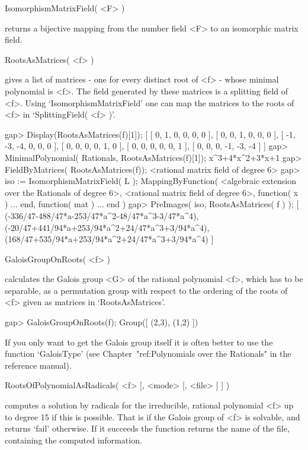 \> IsomorphismMatrixField( <F> )

returns a bijective mapping from the number field <F> to an isomorphic
matrix field.
 
\> RootsAsMatrices( <f> )

gives a list of matrices - one for every distinct root of <f> - whose minimal
polynomial is <f>. The field generated by these matrices is a
splitting field of <f>. Using `IsomorphismMatrixField' one can map the
matrices to the roots of <f> in `SplittingField( <f> )'.

\beginexample
gap> Display(RootsAsMatrices(f)[1]);
[ [   0,   1,   0,   0,   0,   0 ],
  [   0,   0,   1,   0,   0,   0 ],
  [  -1,  -3,  -4,   0,   0,   0 ],
  [   0,   0,   0,   0,   1,   0 ],
  [   0,   0,   0,   0,   0,   1 ],
  [   0,   0,   0,  -1,  -3,  -4 ] ]
gap> MinimalPolynomial( Rationals, RootsAsMatrices(f)[1]);
x^3+4*x^2+3*x+1
gap> FieldByMatrices( RootsAsMatrices(f));
<rational matrix field of degree 6>
gap> iso := IsomorphismMatrixField( L );
MappingByFunction( <algebraic extension over the Rationals of degree
6>, <rational matrix field of degree
6>, function( x ) ... end, function( mat ) ... end )
gap> PreImages( iso, RootsAsMatrices( f ) );
[ (-336/47-488/47*a-253/47*a^2-48/47*a^3-3/47*a^4),
  (-20/47+441/94*a+253/94*a^2+24/47*a^3+3/94*a^4),
  (168/47+535/94*a+253/94*a^2+24/47*a^3+3/94*a^4) ]
\endexample

\> GaloisGroupOnRoots( <f> )

calculates the Galois group <G> of the rational polynomial <f>, which
has to be separable, as a permutation group with respect to the
ordering of the roots of <f> given as matrices in `RootsAsMatrices'.

\beginexample
gap> GaloisGroupOnRoots(f);
Group([ (2,3), (1,2) ])
\endexample

If you only want to get the Galois group itself it is often better to use
the function `GaloisType' (see Chapter~"ref:Polynomials over the Rationals" in
the {\GAP} reference manual).



\> RootsOfPolynomialAsRadicals( <f> [, <mode> [, <file> ] ] )

computes a solution by radicals for the irreducible, rational polynomial <f>
up to degree 15 if this is possible. That is if the Galois group of <f> is
solvable, and returns `fail' otherwise. If it succeeds the function
returns the name of the file, containing the computed information.

